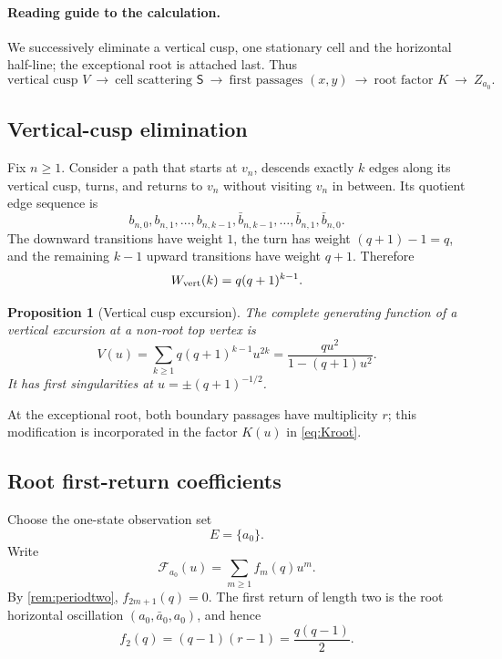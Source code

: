 \documentclass[11pt,reqno]{amsart}
\numberwithin{equation}{section}
\newtheorem{proposition}[theorem]{Proposition}
\theoremstyle{definition}
\theoremstyle{remark}
\newcommand{\cF}{\mathcal F}
\begin{document}
\paragraph{Reading guide to the calculation.}
We successively eliminate a vertical cusp, one stationary cell and the
horizontal half-line; the exceptional root is attached last.  Thus
\[
 \text{vertical cusp }V
 \ \longrightarrow\ \text{cell scattering }\mathsf S
 \ \longrightarrow\ \text{first passages }(x,y)
 \ \longrightarrow\ \text{root factor }K
 \ \longrightarrow\ Z_{a_0}.
\]

\subsection{Vertical-cusp elimination}

Fix $n\ge1$.  Consider a path that starts at $v_n$, descends exactly $k$ edges
along its vertical cusp, turns, and returns to $v_n$ without visiting $v_n$ in
between.  Its quotient edge sequence is
\[
 b_{n,0},b_{n,1},\ldots,b_{n,k-1},
 \bar b_{n,k-1},\ldots,\bar b_{n,1},\bar b_{n,0}.
\]
The downward transitions have weight $1$, the turn has weight
$(q+1)-1=q$, and the remaining $k-1$ upward transitions have weight $q+1$.
Therefore
\begin{equation}\label{eq:excursionweight}
 W_{\rm vert}(k)=q(q+1)^{k-1}.
\end{equation}

\begin{proposition}[Vertical cusp excursion]\label{prop:vertical}
The complete generating function of a vertical excursion at a non-root top
vertex is
\begin{equation}\label{eq:vertical}
 V(u)
 =\sum_{k\ge1}q(q+1)^{k-1}u^{2k}
 =\frac{q u^2}{1-(q+1)u^2}.
\end{equation}
It has first singularities at $u=\pm(q+1)^{-1/2}$.
\end{proposition}

At the exceptional root, both boundary passages have multiplicity $r$; this
modification is incorporated in the factor $K(u)$ in \eqref{eq:Kroot}.

\subsection{Root first-return coefficients}

Choose the one-state observation set
\[
 E=\{a_0\}.
\]
Write
\[
 \cF_{a_0}(u)=\sum_{m\ge1}f_m(q)u^m.
\]
By \cref{rem:periodtwo}, $f_{2m+1}(q)=0$.  The first return of length two is
the root horizontal oscillation
$(a_0,\bar a_0,a_0)$, and hence
\begin{equation}\label{eq:f2}
 f_2(q)=(q-1)(r-1)=\frac{q(q-1)}2.
\end{equation}
\end{document}
